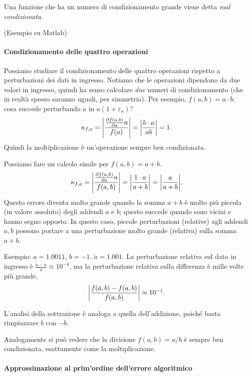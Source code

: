 \documentclass[a4paper]{report}
\DeclarePairedDelimiter{\abs}{\lvert}{\rvert}
\theoremstyle{definiton}
\theoremstyle{remark}
\begin{document}
Una funzione che ha un numero di condizionamento grande viene detta \emph{mal condizionata}.

(Esempio su Matlab)

\paragraph{Condizionamento delle quattro operazioni}

Possiamo studiare il condizionamento delle quattro operazioni rispetto a perturbazioni dei dati in ingresso. Notiamo che le operazioni dipendono da due valori in ingresso, quindi ha senso calcolare \emph{due} numeri di condizionamento (che in realtà spesso saranno uguali, per simmetria). Per esempio, $f(a,b) = a \cdot b$; cosa succede perturbando $a$ in $a(1+\varepsilon_a)$? 
\[
\kappa_{f,a} = \abs*{\frac{\frac{\partial f(a,b)}{\partial a} a}{f(a)}} = \abs*{\frac{b \cdot a}{ab}} = 1.
\]
Quindi la moltiplicazione è un'operazione sempre ben condizionata.

Possiamo fare un calcolo simile per $f(a,b) = a + b$.
\[
\kappa_{f,a} = \abs*{\frac{\frac{\partial f(a,b)}{\partial a} a}{f(a,b)}} = \abs*{\frac{1 \cdot a}{a + b}} = \abs*{\frac{a}{a+b}}.
\]
Questo errore diventa molto grande quando la somma $a+b$ è molto più piccola (in valore assoluto) degli addendi $a$ e $b$; questo succede quando sono vicini e hanno segno opposto. In questo caso, piccole perturbazioni (relative) agli addendi $a,b$ possono portare a una perturbazione molto grande (relativa) sulla somma $a+b$.

Esempio: $a = 1.0011$, $b = -1$. $\tilde{a} = 1.001$. La perturbazione relativa sul dato in ingresso è $\frac{\tilde{a}-a}{a} \approx 10^{-4}$, ma la perturbazione relativa sulla differenza è mille volte più grande,
\[
\abs*{\frac{f(\tilde{a},b) - f(a,b)}{f(a,b)}} \approx 10^{-1}.
\]

L'analisi della sottrazione è analoga a quella dell'addizione, poiché basta rimpiazzare $b$ con $-b$.

Analogamente si può vedere che la divisione $f(a,b) = a / b$ è sempre ben condizionata, esattamente come la moltiplicazione.


\paragraph{Approssimazione al prim'ordine dell'errore algoritmico}
\end{document}
